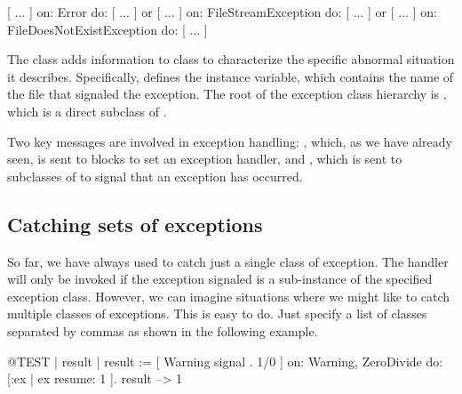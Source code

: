 \begin{code}{}
[ ... ] on: Error do: [ ... ]  or 
[ ... ] on: FileStreamException do: [ ... ] or 
[ ... ] on: FileDoesNotExistException do: [ ... ]
\end{code}


The class  adds information to class  to characterize the specific abnormal situation it describes. Specifically,  defines the  instance variable, which contains the name of the file that signaled the exception. The root of the exception class hierarchy is , which is a direct subclass of .


Two key messages are involved in exception handling: , which, as we have already seen, is sent to blocks to set an exception handler, and , which is sent to subclasses of  to signal that an exception has occurred.

\subsection{Catching sets of exceptions}

So far, we have always used  to catch just a single class of exception. The handler will only be invoked if the exception signaled is a sub-instance of the specified exception class.
However, we can imagine situations where we might like to catch multiple classes of exceptions. This is easy to do. Just specify a list of classes separated by commas as shown in the following example.

\begin{code}{@TEST | result |}
result := [ Warning signal . 1/0 ]
	on: Warning, ZeroDivide
	do: [:ex | ex resume: 1 ].
result --> 1
\end{code}

